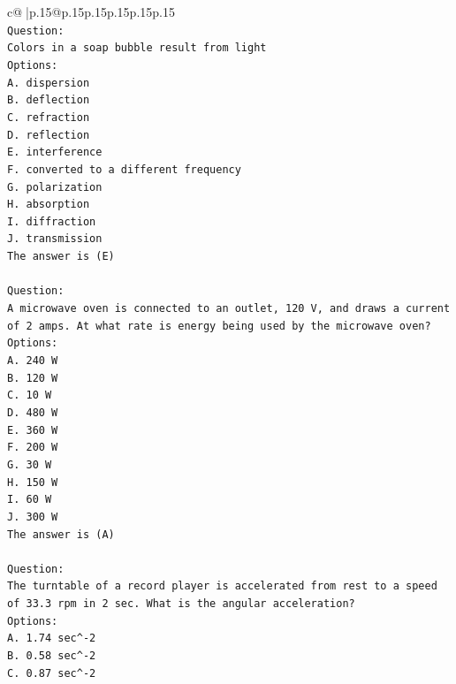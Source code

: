 \documentclass{article}
\begin{document}
{\begin{supertabular}{c@{$\;$}|p{.15\linewidth}@{}p{.15\linewidth}p{.15\linewidth}p{.15\linewidth}p{.15\linewidth}p{.15\linewidth}}
{{{\\ 
\texttt{Question:} \\
\texttt{Colors in a soap bubble result from light} \\
\texttt{Options:} \\
\texttt{A. dispersion} \\
\texttt{B. deflection} \\
\texttt{C. refraction} \\
\texttt{D. reflection} \\
\texttt{E. interference} \\
\texttt{F. converted to a different frequency} \\
\texttt{G. polarization} \\
\texttt{H. absorption} \\
\texttt{I. diffraction} \\
\texttt{J. transmission} \\
\texttt{The answer is (E)} \\
\\ 
\texttt{Question:} \\
\texttt{A microwave oven is connected to an outlet, 120 V, and draws a current of 2 amps. At what rate is energy being used by the microwave oven?} \\
\texttt{Options:} \\
\texttt{A. 240 W} \\
\texttt{B. 120 W} \\
\texttt{C. 10 W} \\
\texttt{D. 480 W} \\
\texttt{E. 360 W} \\
\texttt{F. 200 W} \\
\texttt{G. 30 W} \\
\texttt{H. 150 W} \\
\texttt{I. 60 W} \\
\texttt{J. 300 W} \\
\texttt{The answer is (A)} \\
\\ 
\texttt{Question:} \\
\texttt{The turntable of a record player is accelerated from rest to a speed of 33.3 rpm in 2 sec. What is the angular acceleration?} \\
\texttt{Options:} \\
\texttt{A. 1.74 sec\^{}{-}2} \\
\texttt{B. 0.58 sec\^{}{-}2} \\
\texttt{C. 0.87 sec\^{}{-}2} \\
}}}
\end{supertabular}}
\end{document}
